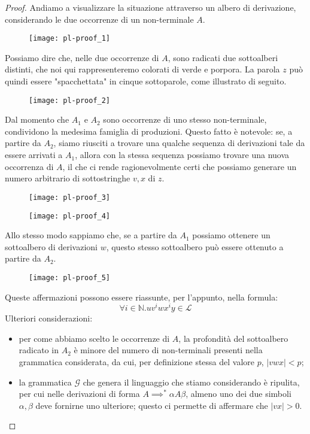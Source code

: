 \documentclass[class=book, crop=false, oneside, 12pt]{standalone}
\begin{document}
\begin{proof}
  Andiamo a visualizzare la situazione attraverso un albero di derivazione, considerando le due occorrenze di un non-terminale \(A\).
  \begin{figure}[H]
    \centering
    \texttt{[image: pl-proof\_1]}
  \end{figure}
  Possiamo dire che, nelle due occorrenze di \(A\), sono radicati due sottoalberi distinti, che noi qui rappresenteremo colorati di verde e porpora. La parola \(z\) può quindi essere "spacchettata" in cinque sottoparole, come illustrato di seguito.
  \begin{figure}[H]
    \centering
    \texttt{[image: pl-proof\_2]}
  \end{figure}
  Dal momento che \(A_1\) e \(A_2\) sono occorrenze di uno stesso non-terminale, condividono la medesima famiglia di produzioni. Questo fatto è notevole: se, a partire da \(A_2\), siamo riusciti a trovare una qualche sequenza di derivazioni tale da essere arrivati a \(A_1\), allora con la stessa sequenza possiamo trovare una nuova occorrenza di \(A\), il che ci rende ragionevolmente certi che possiamo generare un numero arbitrario di sottostringhe \(v, x\) di \(z\).
  \begin{figure}[H]
    \centering
    \begin{minipage}{0.25\textwidth}
      \centering
      \texttt{[image: pl-proof\_3]}
    \end{minipage}
     \hfill
    \begin{minipage}{0.25\textwidth}
      \centering
      \texttt{[image: pl-proof\_4]}
    \end{minipage}
  \end{figure}
  Allo stesso modo sappiamo che, se a partire da \(A_1\) possiamo ottenere un sottoalbero di derivazioni \(w\), questo stesso sottoalbero può essere ottenuto a partire da \(A_2\).
  \begin{figure}[H]
    \centering
    \texttt{[image: pl-proof\_5]}
  \end{figure}
  Queste affermazioni possono essere riassunte, per l'appunto, nella formula:
  \begin{equation*}
    \forall i \in \mathbb{N}.uv^iwx^iy \in \mathcal{L}
  \end{equation*}
  Ulteriori considerazioni:
   \begin{itemize}
     \item per come abbiamo scelto le occorrenze di \(A\), la profondità del sottoalbero radicato in \(A_2\) è minore del numero di non-terminali presenti nella grammatica considerata, da cui, per definizione stessa del valore \(p\), \(|vwx| < p\);
     \item la grammatica \(\mathcal{G}\) che genera il linguaggio che stiamo considerando è ripulita, per cui nelle derivazioni di forma \(A \implies^* \alpha A \beta\), almeno uno dei due simboli \(\alpha, \beta\) deve fornirne uno ulteriore; questo ci permette di affermare che \(|vx| > 0\).
   \end{itemize}


\end{proof}
\end{document}
